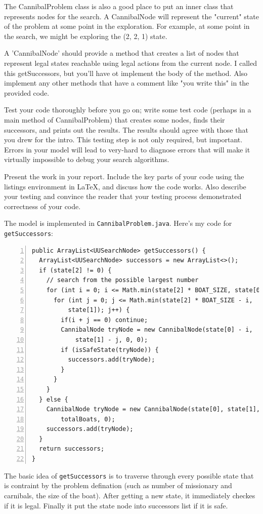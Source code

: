 \documentclass{article}
\begin{document}
The CannibalProblem class is also a good place to put an inner class that represents nodes for the search. A CannibalNode will represent the "current" state of the problem at some point in the exploration. For example, at some point in the search, we might be exploring the (2, 2, 1) state.

A 'CannibalNode' should provide a method that creates a list of nodes that represent legal states reachable using legal actions from the current node. I called this getSuccessors, but you'll have ot implement the body of the method. Also implement any other methods that have a comment like "you write this" in the provided code.

Test your code thoroughly before you go on; write some test code (perhaps in a main method of CannibalProblem) that creates some nodes, finds their successors, and prints out the results. The results should agree with those that you drew for the intro. This testing step is not only required, but important. Errors in your model will lead to very-hard to diagnose errors that will make it virtually impossible to debug your search algorithms.

Present the work in your report. Include the key parts of your code using the listings environment in LaTeX, and discuss how the code works. Also describe your testing and convince the reader that your testing process demonstrated correctness of your code.



The model is implemented in 
\verb`CannibalProblem.java`.  Here's my code for \verb`getSuccessors`:

\begin{lstlisting}[numbers=left]
public ArrayList<UUSearchNode> getSuccessors() {
  ArrayList<UUSearchNode> successors = new ArrayList<>();
  if (state[2] != 0) {
    // search from the possible largest number
    for (int i = 0; i <= Math.min(state[2] * BOAT_SIZE, state[0]); i++) {
      for (int j = 0; j <= Math.min(state[2] * BOAT_SIZE - i,
          state[1]); j++) {
        if(i + j == 0) continue;
        CannibalNode tryNode = new CannibalNode(state[0] - i,
            state[1] - j, 0, 0);
        if (isSafeState(tryNode)) {
          successors.add(tryNode);
        }
      }
    }
  } else {
    CannibalNode tryNode = new CannibalNode(state[0], state[1],
        totalBoats, 0);
    successors.add(tryNode);
  }
  return successors;
}
\end{lstlisting}

The basic idea of \verb`getSuccessors` is to traverse through every possible state that is contraint by the problem defination (such as number of missionary and carnibals, the size of the boat). After getting a new state, it immediately checkes if it is legal. Finally it put the state node into successors list if it is safe.
\end{document}
